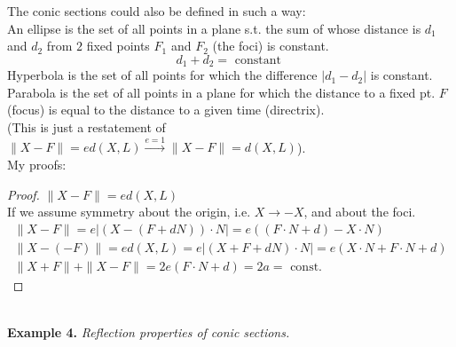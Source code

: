 \documentclass[twoside]{amsart}
\theoremstyle{plain}
\theoremstyle{definition}
\begin{document}
The conic sections could also be defined in such a way: \bigskip \\
An ellipse is the set of all points in a plane s.t. the sum of whose distance is $d_1$ and $d_2$ from $2$ fixed points $F_1$ and $F_2$ (the foci) is constant.  
\[
d_1 + d_2 = \text{ constant }
\]
Hyperbola is the set of all points for which the difference $|d_1 - d_2|$ is constant.  \smallskip \\
Parabola is the set of all points in a plane for which the distance to a fixed pt. $F$ (focus) is equal to the distance to a given time (directrix).  \\
\quad \quad (This is just a restatement of $\| X - F \| = ed(X,L) \xrightarrow{ e=1} \| X - F \| = d(X,L)$).   \quad \\

My proofs:
\begin{proof}
  $\| X - F \| = e d(X,L)$ \\
  If we assume symmetry about the origin, i.e. $X \to -X$, and about the foci.  
\[
\begin{gathered}
  \| X - F \| = e| (X - (F + dN))\cdot N | = e((F\cdot N + d) -X\cdot N) \\
  \| X - (-F) \| = ed(X,L) = e|(X+F + dN)\cdot N| = e(X\cdot N + F\cdot N + d) \\
  \| X + F \| + \| X - F \| = 2e(F\cdot N + d) = 2a = \text{ const. }
\end{gathered}
\]
\end{proof}
\quad \\

\textbf{ Example 4. } \emph{ Reflection properties of conic sections.} \medskip \\
\end{document}

